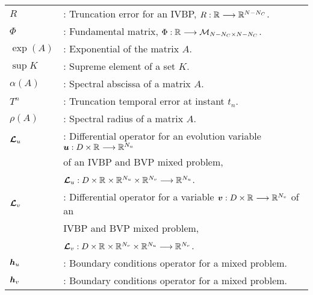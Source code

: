 \begin{tabular}{ll}
      $R$ & :  Truncation error for an IVBP, $R :  \mathbb{R}^{}  \longrightarrow  \mathbb{R}^{N-N_C} $.\\
     
      $\Phi$ & :  Fundamental matrix, $\Phi : \mathbb{R}^{} \longrightarrow \mathcal{M}_{N-N_C \times N-N_C}$.\\
     
     
      $\exp(A)$ & :  Exponential of the matrix $A$.\\
     
      $\sup K$ & :  Supreme element of a set $K$.\\
     
      $\alpha(A)$ & :  Spectral abscissa of a matrix $A$.\\
     
      $T^n$ & :  Truncation temporal error at instant $t_n$.\\
     
      $\rho( A) $ & :  Spectral radius of a matrix $ A$.\\
      
      $\boldsymbol{\mathcal{L}}_u$ & : Differential operator for an evolution variable $\boldsymbol{u} : D\times\mathbb{R}^{} \longrightarrow \mathbb{R}^{N_u}$ \\ &  of an IVBP and BVP mixed problem,\\ &   $\boldsymbol{\mathcal{L}}_u : D\times\mathbb{R}^{}\times\mathbb{R}^{N_u}\times\mathbb{R}^{N_v} \longrightarrow \mathbb{R}^{N_u}$. \\
      
      $\boldsymbol{\mathcal{L}}_v$ & : Differential operator for a variable $\boldsymbol{v} : D\times\mathbb{R}^{} \longrightarrow \mathbb{R}^{N_v}$ of an \\ & IVBP and BVP mixed problem,\\ &   $\boldsymbol{\mathcal{L}}_v : D\times\mathbb{R}^{}\times\mathbb{R}^{N_v}\times\mathbb{R}^{N_u} \longrightarrow \mathbb{R}^{N_v}$. \\
      
      $\boldsymbol{h}_u$ & : Boundary conditions operator for a mixed problem. \\
  
      $\boldsymbol{h}_v$ & : Boundary conditions operator for a mixed problem. \\
      
      
     
\end{tabular}






